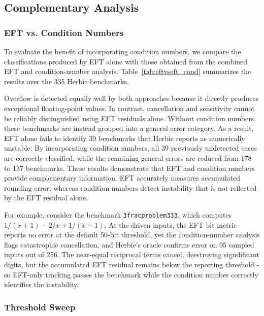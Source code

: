 \subsection{Complementary Analysis}
\label{sec:complementary}

\subsubsection{EFT vs. Condition Numbers}
\label{sec:eftvscond}

To evaluate the benefit of incorporating condition numbers, we compare the classifications produced by EFT alone with those obtained from the combined EFT and condition-number analysis. Table~\ref{tab:eftvseft_cond} summarizes the results over the 335 Herbie benchmarks.



Overflow is detected equally well by both approaches because it directly produces exceptional floating-point values. In contrast, cancellation and sensitivity cannot be reliably distinguished using EFT residuals alone. Without condition numbers, these benchmarks are instead grouped into a general error category. As a result, EFT alone fails to identify 39 benchmarks that Herbie reports as numerically unstable. By incorporating condition numbers, all 39 previously undetected cases are correctly classified, while the remaining general errors are reduced from 178 to 137 benchmarks. These results demonstrate that EFT and condition numbers provide complementary information. EFT accurately measures accumulated rounding error, whereas condition numbers detect instability that is not reflected by the EFT residual alone.

For example, consider the benchmark \texttt{3fracproblem333}, which computes $1/(x+1)-2/x + 1/(x-1)$. At the driven inputs, the EFT bit metric reports no error at the default 50-bit threshold, yet the condition-number analysis flags catastrophic cancellation, and Herbie's oracle confirms error on 95 sampled inputs out of 256. The near-equal reciprocal terms cancel, deestroying signdificant digits, but the accumulated EFT residual remains below the reporting threshold - so EFT-only tracking passes the benchmark while the condition number correctly identifies the instability.

\subsubsection{Threshold Sweep}
\label{sec:thresholdsweep}

